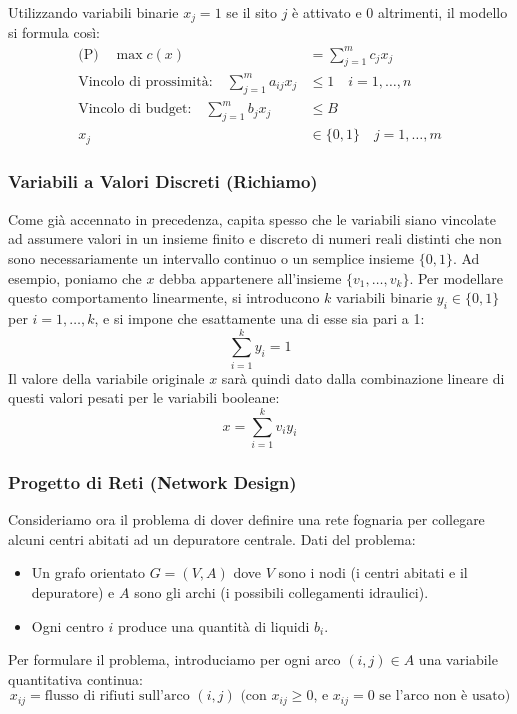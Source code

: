 \documentclass[12pt]{extarticle} %
\begin{document}
Utilizzando variabili binarie $x_j = 1$ se il sito $j$ è attivato e $0$ altrimenti, il modello si formula così:
\[
\begin{aligned}
\text{(P)} \quad \max c(x) &= \sum_{j=1}^m c_j x_j \\
\text{Vincolo di prossimità:} \quad \sum_{j=1}^m a_{ij}x_j &\le 1 \quad i=1,\dots,n \\
\text{Vincolo di budget:} \quad \sum_{j=1}^m b_j x_j &\le B \\
x_j &\in \{0,1\} \quad j=1,\dots,m
\end{aligned}
\]

\subsubsection{Variabili a Valori Discreti (Richiamo)}
Come già accennato in precedenza, capita spesso che le variabili siano vincolate ad assumere valori in un insieme finito e discreto di numeri reali distinti che non sono necessariamente un intervallo continuo o un semplice insieme $\{0,1\}$. Ad esempio, poniamo che $x$ debba appartenere all'insieme $\{v_1, \dots, v_k\}$.
Per modellare questo comportamento linearmente, si introducono $k$ variabili binarie $y_i \in \{0,1\}$ per $i=1,\dots,k$, e si impone che esattamente una di esse sia pari a 1:
\[
\sum_{i=1}^k y_i = 1
\]
Il valore della variabile originale $x$ sarà quindi dato dalla combinazione lineare di questi valori pesati per le variabili booleane:
\[
x = \sum_{i=1}^k v_i y_i
\]

\subsubsection{Progetto di Reti (Network Design)}
Consideriamo ora il problema di dover definire una rete fognaria per collegare alcuni centri abitati ad un depuratore centrale. 
Dati del problema:
\begin{itemize}
    \item Un grafo orientato $G=(V,A)$ dove $V$ sono i nodi (i centri abitati e il depuratore) e $A$ sono gli archi (i possibili collegamenti idraulici).
    \item Ogni centro $i$ produce una quantità di liquidi $b_i$.
\end{itemize}

Per formulare il problema, introduciamo per ogni arco $(i,j) \in A$ una variabile quantitativa continua:
\[
x_{ij} = \text{flusso di rifiuti sull'arco } (i,j) \text{ (con } x_{ij} \ge 0 \text{, e } x_{ij}=0 \text{ se l'arco non è usato)}
\]
\end{document}
